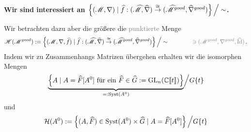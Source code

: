 \begin{center}
  \textbf{Wir sind interessiert an
    $\left\{(\mathscr{M},\nabla)
        \mid \widehat f:(\widehat{\mathscr{M}},\widehat\nabla)
          \overset{\cong}\to
          (\widehat{\mathscr{M}}^{good},\widehat\nabla^{good})
      \right\}\Big/\sim$.}
\end{center}
Wir betrachten dazu aber die größere die \textcolor{gray}{punktierte} Menge
\[
  \sH(\sM^{good}):=\left\{(\sM,\nabla,\hat f)
      \mid \hat f:(\hat\sM,\hat\nabla)
        \overset{\cong}\to
        (\hat\sM^{good},\hat\nabla^{good})
    \right\}\Big/\sim
    \qquad \qquad
    \textcolor{gray}{\ni (\sM^{good},\nabla^{good},\hat \Id)}\,.
\]
Indem wir zu Zusammenhangs Matrizen übergehen erhalten wir die isomorphen
Mengen
\[
  \underset{=:\Syst(A^0)}{\underbrace{%
      \left\{A \mid A=\hat F[A^0]\text{~für ein~}\hat F\in\hat G
      :=\GL_n(\C\llbracket t\rrbracket)\right\}
  }}\Big/G\{t\}
\]
und
\[
  \mathcal{H}(A^0):=\left\{
      (A,\widehat F)\in\operatorname{Syst}(A^0)\times\widehat G\mid A=\widehat F[A^0]
    \right\}\Big/G\{t\}
\]


